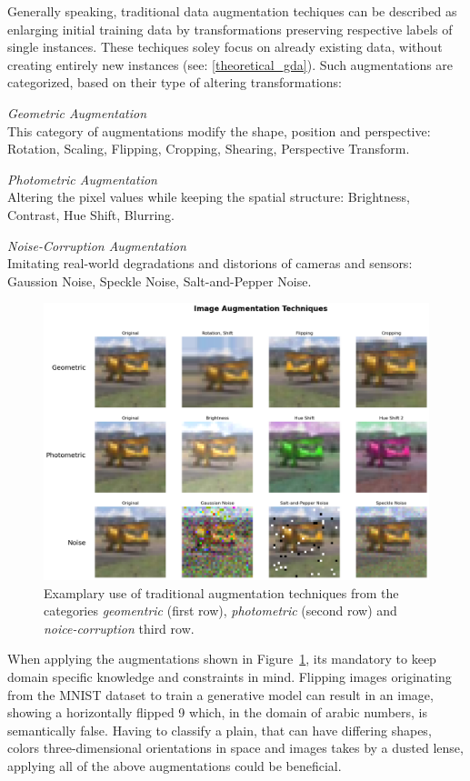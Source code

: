 Generally speaking, traditional data augmentation techiques can be described as enlarging initial training data by transformations preserving respective labels of single instances. These techiques soley focus on already existing data, without creating entirely new instances (see: \ref{theoretical_gda}). Such augmentations are categorized, based on their type of altering transformations:

\noindent\textit{Geometric Augmentation}\\
This category of augmentations modify the shape, position and perspective: Rotation, Scaling, Flipping, Cropping, Shearing, Perspective Transform.

\noindent\textit{Photometric Augmentation}\\
Altering the pixel values while keeping the spatial structure: Brightness, Contrast, Hue Shift, Blurring.

\noindent\textit{Noise-Corruption Augmentation}\\
Imitating real-world degradations and distorions of cameras and sensors: Gaussion Noise, Speckle Noise, Salt-and-Pepper Noise.\\

\begin{figure}[htbp]
    \centering
    \includegraphics[width=.9\textwidth]{abb/traditional_image_augmentation_examples.png}
    \caption{Examplary use of traditional augmentation techniques from the categories \textit{geomentric} (first row), \textit{photometric} (second row) and \textit{noice-corruption} third row.}
    \label{fig:figure_tda_examples}
\end{figure}

\noindent
When applying the augmentations shown in Figure~\ref{fig:figure_tda_examples}, its mandatory to keep domain specific knowledge and constraints in mind. Flipping images originating from the MNIST dataset to train a generative model can result in an image, showing a horizontally flipped 9 which, in the domain of arabic numbers, is semantically false. Having to classify a plain, that can have differing shapes, colors three-dimensional orientations in space and images takes by a dusted lense, applying all of the above augmentations could be beneficial.

